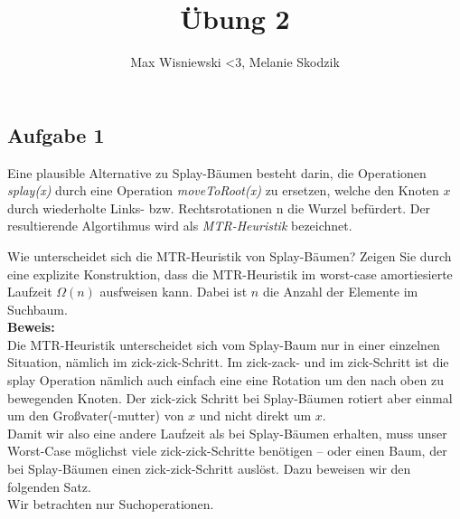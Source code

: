 \documentclass[11pt,a4paper,ngerman]{article}
\date{}
\title{Übung 2}
\author{Max Wisniewski <3, Melanie Skodzik}
\begin{document}

\renewcommand{\figurename}{Figure}

\maketitle
\thispagestyle{fancy}


\subsection*{Aufgabe 1}


Eine plausible Alternative zu Splay-Bäumen besteht darin, die Operationen \emph{splay(x)} durch eine Operation \emph{moveToRoot(x)} zu ersetzen, welche den Knoten $x$ durch wiederholte Links- bzw. Rechtsrotationen n die Wurzel befürdert. Der resultierende Algortihmus wird als \emph{MTR-Heuristik} bezeichnet.

Wie unterscheidet sich die MTR-Heuristik von Splay-Bäumen? Zeigen Sie durch eine explizite Konstruktion, dass die MTR-Heuristik im worst-case amortiesierte Laufzeit $\Omega(n)$ ausfweisen kann. Dabei ist $n$ die Anzahl der Elemente im Suchbaum.\\

\noindent\textbf{Beweis:}\\

Die MTR-Heuristik unterscheidet sich vom Splay-Baum nur in einer einzelnen Situation, nämlich im zick-zick-Schritt. Im zick-zack- und im zick-Schritt ist die splay Operation nämlich auch einfach eine eine Rotation um den nach oben zu bewegenden Knoten. Der zick-zick Schritt bei Splay-Bäumen rotiert aber einmal um den Großvater(-mutter) von $x$ und nicht direkt um $x$.\\

Damit wir also eine andere Laufzeit als bei Splay-Bäumen erhalten, muss unser Worst-Case möglichst viele zick-zick-Schritte benötigen -- oder einen Baum, der bei Splay-Bäumen einen zick-zick-Schritt auslöst. Dazu beweisen wir den folgenden Satz.\\

Wir betrachten nur Suchoperationen.
\end{document}
